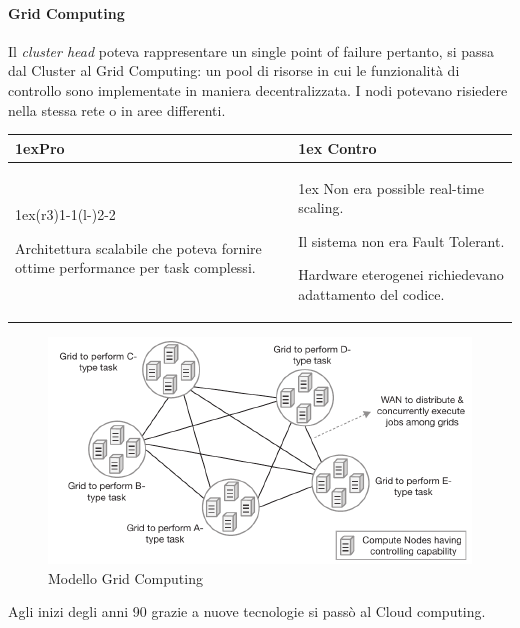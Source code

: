 \documentclass{article}
\begin{document}
\paragraph{Grid Computing}
Il \textit{cluster head} poteva rappresentare un single point of failure pertanto, si passa dal Cluster al Grid Computing: un pool di risorse in cui le funzionalità di controllo sono implementate in maniera decentralizzata. I nodi potevano risiedere nella stessa rete o in aree differenti.

\begin{table}[H]
    \begin{tabularx}{\linewidth}{>{\parskip1ex}X@{\kern4\tabcolsep}>{\parskip1ex}X}
    \toprule
    \hfil\bfseries Pro
    &
    \hfil\bfseries Contro
    \\\cmidrule(r{3\tabcolsep}){1-1}\cmidrule(l{-\tabcolsep}){2-2}
    
    Architettura scalabile che poteva fornire ottime performance per task complessi.\par
    &
    Non era possible real-time scaling.\par
    Il sistema non era Fault Tolerant.\par
    Hardware eterogenei richiedevano adattamento del codice.\par
    \\\bottomrule
    \end{tabularx}
\end{table}
\begin{figure}[H]
    \centering
    \includegraphics[scale=1]{img/grid.png}
    \caption{Modello Grid Computing}
\end{figure}
Agli inizi degli anni 90 grazie a nuove tecnologie si passò al Cloud computing.
\end{document}
